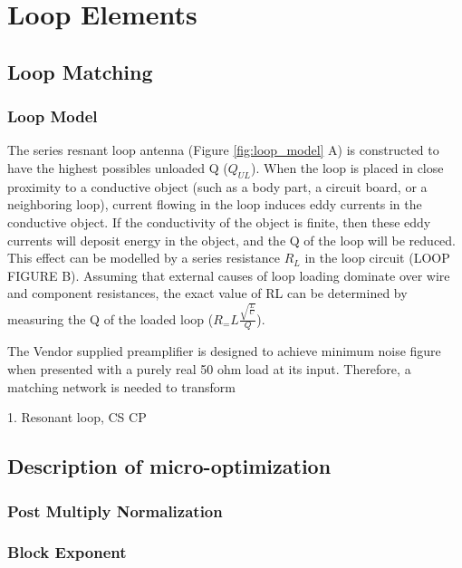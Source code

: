 \chapter{Loop Elements}

\section{Loop Matching}
\subsection{Loop Model}

The series resnant loop antenna (Figure \ref{fig:loop_model} A) is constructed to have the highest possibles unloaded Q
($Q_{UL}$). When the loop is placed in close proximity to a conductive object (such as a body part, a circuit board, or
a neighboring loop), current flowing in the loop induces eddy currents in the conductive object. If the conductivity of
the object is finite, then these eddy currents will deposit energy in the object, and the Q of the loop will be reduced.
This effect can be modelled by a series resistance $R_L$ in the loop circuit (LOOP FIGURE B). Assuming that external causes
of loop loading dominate over wire and component resistances, the exact value of RL can be determined by measuring the Q
of the loaded loop ($R_=L\frac{\sqrt{\frac{L}{C}}}{Q}$).

The Vendor supplied preamplifier is designed to achieve minimum noise figure when presented with a purely real 50 ohm
load at its input. Therefore, a matching network is needed to transform 

1. Resonant loop, CS CP


\section{Description of micro-optimization}\label{ch1:opts}
\subsection{Post Multiply Normalization}
%
\subsection{Block Exponent}

